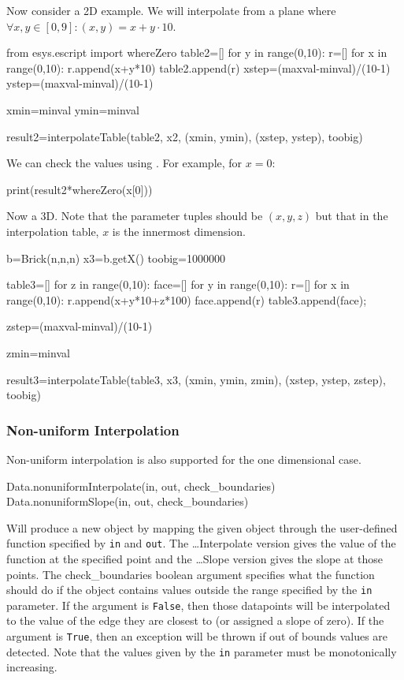 Now consider a 2D example. We will interpolate from a plane where $\forall x,y\in[0,9]:(x,y)=x+y\cdot10$.

\begin{python}
from esys.escript import whereZero
table2=[]
for y in range(0,10):
      r=[]
      for x in range(0,10):
	 r.append(x+y*10)
      table2.append(r)
xstep=(maxval-minval)/(10-1)
ystep=(maxval-minval)/(10-1)

xmin=minval
ymin=minval

result2=interpolateTable(table2, x2, (xmin, ymin), (xstep, ystep), toobig)
\end{python}

We can check the values using .
For example, for $x=0$:
\begin{python}
print(result2*whereZero(x[0])) 
\end{python}

Now a 3D. Note that the parameter tuples should be $(x,y,z)$ but that in the interpolation table, $x$ is the innermost dimension.
\begin{python}
b=Brick(n,n,n)
x3=b.getX()
toobig=1000000

table3=[]
for z in range(0,10):
   face=[]
   for y in range(0,10):
      r=[]
      for x in range(0,10):
	 r.append(x+y*10+z*100)
      face.append(r)
   table3.append(face);

zstep=(maxval-minval)/(10-1)

zmin=minval

result3=interpolateTable(table3, x3, (xmin, ymin, zmin), (xstep, ystep, zstep), toobig)
\end{python}


\subsubsection{Non-uniform Interpolation}
Non-uniform interpolation is also supported for the one dimensional case.
\begin{python}
Data.nonuniformInterpolate(in, out, check_boundaries)
Data.nonuniformSlope(in, out, check_boundaries)
\end{python}

Will produce a new \Data object by mapping the given \Data object through the user-defined function
specified by \texttt{in} and \texttt{out}.
The \ldots Interpolate version gives the value of the function at the specified point and the 
\ldots Slope version gives the slope at those points.
The check_boundaries boolean argument specifies what the function should do if the \Data object contains
values outside the range specified by the \texttt{in} parameter.
If the argument is \texttt{False}, then those datapoints will be interpolated to the value of the edge 
they are closest to (or assigned a slope of zero).
If the argument is \texttt{True}, then an exception will be thrown if out of bounds values are detected.
Note that the values given by the \texttt{in} parameter must be monotonically increasing.

